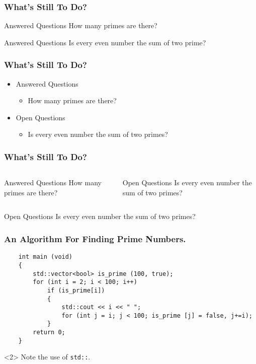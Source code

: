 \documentclass{beamer}
\begin{document}
\begin{frame}
	\frametitle{What's Still To Do?}
	
	\begin{block}{Answered Questions}
		How many primes are there?
	\end{block}
	
	\begin{block}{Answered Questions}
		Is every even number the sum of two prime?
	\end{block}
\end{frame}

\begin{frame}
	\frametitle{What’s Still To Do?}
	\begin{itemize}
		\item Answered Questions
		\begin{itemize}
			\item How many primes are there?
		\end{itemize}
		
		\item Open Questions
		\begin{itemize}
			\item Is every even number the sum of two primes?
		\end{itemize}
	\end{itemize}
\end{frame}

\begin{frame}
	\frametitle{What’s Still To Do?}
	\begin{columns}[t]
		\begin{block}{Answered Questions}
			How many primes are there?
		\end{block}
		
		\begin{block}{Open Questions}
			Is every even number the sum of two primes?
		\end{block}
	\end{columns}
\end{frame}

\begin{frame}
	\begin{block}{Open Questions}
		Is every even number the sum of two primes?\cite{Goldbach1742}
	\end{block}
\end{frame}

\begin{frame}[fragile]
	\frametitle{An Algorithm For Finding Prime Numbers.}
	\begin{verbatim}
	int main (void)
	{
		std::vector<bool> is_prime (100, true);
		for (int i = 2; i < 100; i++)
			if (is_prime[i])
			{
				std::cout << i << " ";
				for (int j = i; j < 100; is_prime [j] = false, j+=i);
			}
		return 0;
	}
	\end{verbatim}
	\begin{uncoverenv}
		Note the use of \verb|std::|.
	\end{uncoverenv}
\end{frame}
\end{document}

